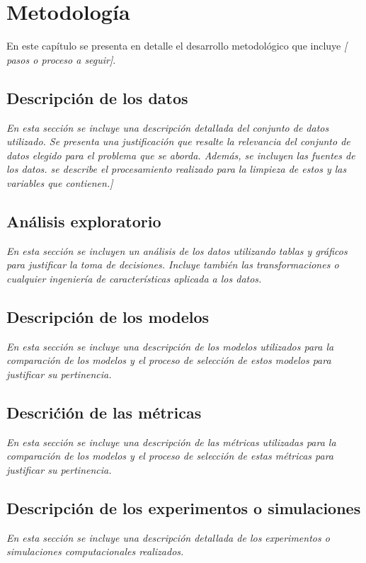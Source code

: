 \chapter{Metodología}
\label{ch:method}

En este capítulo se presenta en detalle el desarrollo metodológico que incluye \textit{[ pasos o proceso a seguir]}.

\newpage

\section{Descripción de los datos}

\textit{En esta sección se incluye una descripción detallada del conjunto de datos utilizado. Se presenta una justificación que resalte la relevancia del conjunto de datos elegido para el problema que se aborda. Además, se incluyen las fuentes de los datos. se describe el procesamiento realizado para la limpieza de estos y las variables que contienen.] }

\section{Análisis exploratorio}

\textit{En esta sección se incluyen un análisis de los datos utilizando tablas y gráficos para justificar la toma de decisiones. Incluye también las transformaciones o cualquier ingeniería de características aplicada a los datos.}

\section{Descripción de los modelos}

\textit{En esta sección se incluye una descripción de los modelos utilizados para la comparación de los modelos y el proceso de selección de estos modelos para justificar su pertinencia.}

\section{Descrićión de las métricas}

\textit{En esta sección se incluye una descripción de las métricas utilizadas para la comparación de los modelos y el proceso de selección de estas métricas para justificar su pertinencia.}

\section{Descripción de los experimentos o simulaciones}

\textit{En esta sección se incluye una descripción detallada de los experimentos o simulaciones computacionales realizados.}